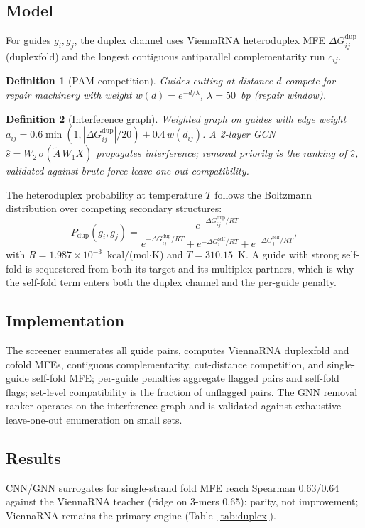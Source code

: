 \documentclass[12pt]{article}
\newtheorem{definition}{Definition}
\begin{document}
\subsection{Model}
For guides $g_i, g_j$, the duplex channel uses ViennaRNA \cite{lorenz2011}
heteroduplex MFE $\Delta G_{ij}^{\text{dup}}$ (duplexfold) and the longest
contiguous antiparallel complementarity run $c_{ij}$.
\begin{definition}[PAM competition]
Guides cutting at distance $d$ compete for repair machinery with weight
$w(d) = e^{-d/\lambda}$, $\lambda = 50$~bp (repair window).
\end{definition}
\begin{definition}[Interference graph]
Weighted graph on guides with edge weight
$a_{ij} = 0.6\min(1,|\Delta G_{ij}^{\text{dup}}|/20) + 0.4\,w(d_{ij})$.
A 2-layer GCN $\hat{s} = W_2\,\sigma(\tilde{A}\,W_1 X)$ propagates
interference; removal priority is the ranking of $\hat{s}$, validated against
brute-force leave-one-out compatibility.
\end{definition}

The heteroduplex probability at temperature $T$ follows the Boltzmann
distribution over competing secondary structures:
\begin{equation}
P_{\text{dup}}(g_i,g_j) = \frac{e^{-\Delta G_{ij}^{\text{dup}}/RT}}
{e^{-\Delta G_{ij}^{\text{dup}}/RT} + e^{-\Delta G_i^{\text{self}}/RT} + e^{-\Delta G_j^{\text{self}}/RT}},
\end{equation}
with $R = 1.987\times10^{-3}$~kcal/(mol$\cdot$K) and $T = 310.15$~K. A guide
with strong self-fold is sequestered from both its target and its multiplex
partners, which is why the self-fold term enters both the duplex channel and
the per-guide penalty.

\subsection{Implementation}
The screener enumerates all guide pairs, computes ViennaRNA duplexfold and
cofold MFEs, contiguous complementarity, cut-distance competition, and
single-guide self-fold MFE; per-guide penalties aggregate flagged pairs and
self-fold flags; set-level compatibility is the fraction of unflagged pairs.
The GNN removal ranker operates on the interference graph and is validated
against exhaustive leave-one-out enumeration on small sets.
\subsection{Results}
CNN/GNN surrogates for single-strand fold MFE reach Spearman 0.63/0.64 against
the ViennaRNA teacher (ridge on 3-mers 0.65): parity, not improvement;
ViennaRNA remains the primary engine (Table~\ref{tab:duplex}).
\end{document}
